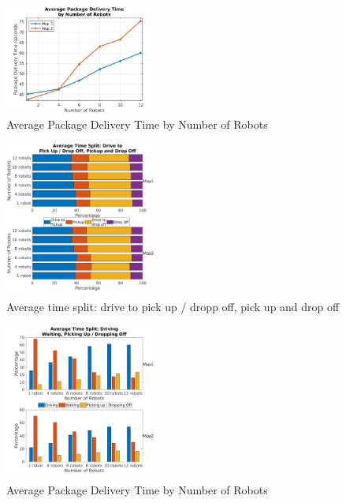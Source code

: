 \documentclass[journal]{IEEEtran}
\begin{document}
\begin{figure}[h]
	\centering
	\includegraphics[width=0.45\textwidth]{resources/Graphs-paper/graph2.png}
	\caption{Average Package Delivery Time by Number of Robots}
	\label{fig:delivery_time}
\end{figure}

\begin{figure}[h]
	\centering
	\includegraphics[width=0.45\textwidth]{resources/Graphs-paper/graph3_2.png}
	\caption{Average time split: drive to pick up / dropp off, pick up and drop off}
	\label{fig:drive_pickup_dropoff}
\end{figure}

\begin{figure}[h]
	\centering
	\includegraphics[width=0.45\textwidth]{resources/Graphs-paper/graph4.png}
	\caption{Average Package Delivery Time by Number of Robots}
	\label{fig:delivery_time}
\end{figure}
\end{document}
